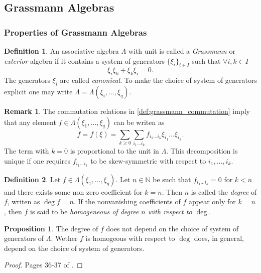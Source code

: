 \documentclass{article}
\theoremstyle{definition}
\newtheorem{definition}{Definition}
\newtheorem{proposition}{Proposition}
\newtheorem*{remark}{Remark}
\begin{document}


\subsection{Grassmann Algebras}
\subsubsection{Properties of Grassmann Algebras}


\begin{definition}
    An associative algebra $\Lambda$ with unit is called a \emph{Grassmann} or \emph{exterior} algebra if it contains a system of generators $\{ \xi_i \}_{i \in I}$ such that $\forall i, k \in I$
    \begin{equation}
        \label{def:grassmann_commutation}
        \xi_i \xi_k + \xi_k \xi_i = 0.
    \end{equation}
    The generators $\xi_i$ are called \emph{canonical}. To make the choice of system of generators explicit one may write $\Lambda = \Lambda (\xi_i, \dots, \xi_q)$.
\end{definition}

\begin{remark}
    The commutation relations in \eqref{def:grassmann_commutation} imply that any element $f \in \Lambda(\xi_1, \dots, \xi_q)$ can be writen as
    \begin{equation}
        \label{eq:grassmann_element}
        f = f(\xi) = \sum_{k \geq 0} \sum_{i_1 \dots i_k}
        f_{i_1 \dots i_k} \xi_{i_1} \dots \xi_{i_k}.
    \end{equation}
    The term with $k = 0$ is proportional to the unit in $\Lambda$. This decomposition is unique if one requires $f_{i_1 \dots i_k}$ to be skew-symmetric with respect to $i_1, \dots, i_k$.
\end{remark}

\begin{definition}
    Let $f \in \Lambda(\xi_1, \dots, \xi_q)$. Let $n \in \mathbb{N}$ be such that $f_{i_1 \dots i_k} = 0$ for $k < n$ and there exists some non zero coefficient for $k = n$. Then $n$ is called the \emph{degree} of $f$, writen as $\deg f = n$. If the nonvanishing coefficients of $f$ appear only for $k = n$, then $f$ is said to be \emph{homogeneous of degree $n$ with respect to $\deg$}.
\end{definition}

\begin{proposition}
    The degree of $f$ does not depend on the choice of system of generators of $\Lambda$. Wether $f$ is homogeous with respect to $\deg$ does, in general, depend on the choice of system of generators.
\end{proposition}
\begin{proof}
    Pages 36-37 of \cite{berezin_introduction_1987}.
\end{proof}
\end{document}
